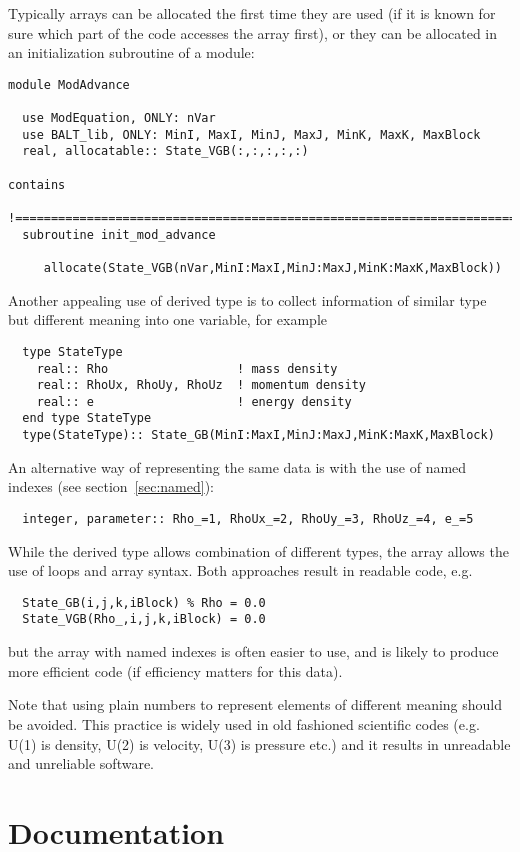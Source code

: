 \documentclass{article}
\begin{document}
Typically arrays can be allocated the first time they are used (if it
is known for sure which part of the code accesses the array first),
or they can be allocated in an initialization subroutine of a module:
\begin{verbatim}
module ModAdvance

  use ModEquation, ONLY: nVar
  use BALT_lib, ONLY: MinI, MaxI, MinJ, MaxJ, MinK, MaxK, MaxBlock
  real, allocatable:: State_VGB(:,:,:,:,:)

contains
  !========================================================================
  subroutine init_mod_advance

     allocate(State_VGB(nVar,MinI:MaxI,MinJ:MaxJ,MinK:MaxK,MaxBlock))
\end{verbatim}
Another appealing use of derived type is to collect information of
similar type but different meaning into one variable, for example
\begin{verbatim}
  type StateType
    real:: Rho                  ! mass density
    real:: RhoUx, RhoUy, RhoUz  ! momentum density
    real:: e                    ! energy density
  end type StateType
  type(StateType):: State_GB(MinI:MaxI,MinJ:MaxJ,MinK:MaxK,MaxBlock)
\end{verbatim}
An alternative way of representing the
same data is with the use of named indexes (see section~\ref{sec:named}):
\begin{verbatim}
  integer, parameter:: Rho_=1, RhoUx_=2, RhoUy_=3, RhoUz_=4, e_=5
\end{verbatim}
While the derived type allows combination of different types, 
the array allows the use of loops and array syntax. Both approaches
result in readable code, e.g.
\begin{verbatim}
  State_GB(i,j,k,iBlock) % Rho = 0.0
  State_VGB(Rho_,i,j,k,iBlock) = 0.0
\end{verbatim}
but the array with named indexes is often easier to use, and is likely
to produce more efficient code (if efficiency matters for this data).

Note that using plain numbers to represent elements of different meaning 
should be avoided. This practice is widely used in old fashioned scientific
codes (e.g. U(1) is density, U(2) is velocity, U(3) is pressure etc.)
and it results in unreadable and unreliable software.

\section{Documentation}
\end{document}
